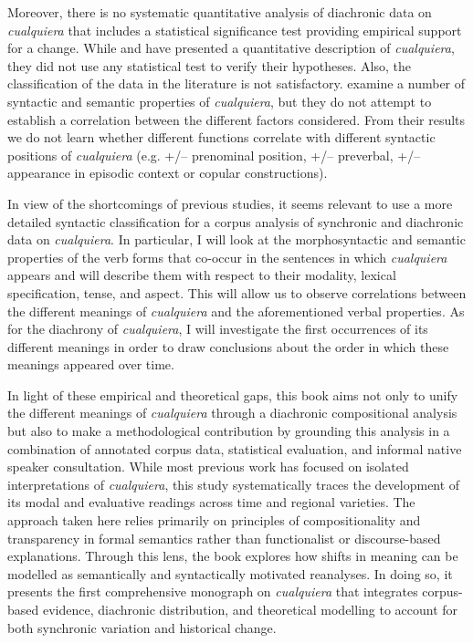 Moreover, there is no systematic quantitative analysis of diachronic data on \textit{cualquiera} that includes a statistical significance test providing empirical support for a change. While \citet{cp2009} and \citet{AloniPort2013} have presented a quantitative description of \textit{cualquiera}, they did not use any statistical test to verify their hypotheses. Also, the classification of the data in the literature is not satisfactory. \citet{AloniPort2013} examine a number of syntactic and semantic properties of \textit{cualquiera}, but they do not attempt to establish a correlation between the different factors considered. From their results we do not learn whether different functions correlate with different syntactic positions of \textit{cualquiera} (e.g. +/– prenominal position, +/– preverbal, +/– appearance in episodic context or copular constructions).

In view of the shortcomings of previous studies, it seems relevant to use a more detailed syntactic classification for a corpus analysis of synchronic and diachronic data on \textit{cualquiera}. In particular, I will look at the morphosyntactic and semantic properties of the verb forms that co-occur in the sentences in which \textit{cualquiera} appears and will describe them with respect to their modality, lexical specification, tense, and aspect. This will allow us to observe correlations between the different meanings of \textit{cualquiera} and the aforementioned verbal properties. As for the diachrony of \textit{cualquiera}, I will investigate the first occurrences of its different meanings in order to draw conclusions about the order in which these meanings appeared over time.

In light of these empirical and theoretical gaps, this book aims not only to unify the different meanings of \textit{cualquiera} through a diachronic compositional analysis but also to make a methodological contribution by grounding this analysis in a combination of annotated corpus data, statistical evaluation, and informal native speaker consultation. While most previous work has focused on isolated interpretations of \textit{cualquiera}, this study systematically traces the development of its modal and evaluative readings across time and regional varieties. The approach taken here relies primarily on principles of compositionality and transparency in formal semantics rather than functionalist or discourse-based explanations. Through this lens, the book explores how shifts in meaning can be modelled as semantically and syntactically motivated reanalyses. In doing so, it presents the first comprehensive monograph on \textit{cualquiera} that integrates corpus-based evidence, diachronic distribution, and theoretical modelling to account for both synchronic variation and historical change.


